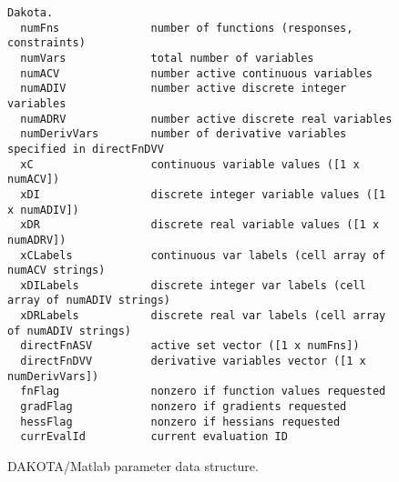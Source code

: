 \begin{figure}
\centering
\begin{bigbox}
\begin{small}
\begin{verbatim}
Dakota.
  numFns              number of functions (responses, constraints)
  numVars             total number of variables
  numACV              number active continuous variables
  numADIV             number active discrete integer variables
  numADRV             number active discrete real variables
  numDerivVars        number of derivative variables specified in directFnDVV
  xC                  continuous variable values ([1 x numACV]) 
  xDI                 discrete integer variable values ([1 x numADIV])
  xDR                 discrete real variable values ([1 x numADRV])
  xCLabels            continuous var labels (cell array of numACV strings)
  xDILabels           discrete integer var labels (cell array of numADIV strings)
  xDRLabels           discrete real var labels (cell array of numADIV strings)
  directFnASV         active set vector ([1 x numFns])
  directFnDVV         derivative variables vector ([1 x numDerivVars])
  fnFlag              nonzero if function values requested
  gradFlag            nonzero if gradients requested
  hessFlag            nonzero if hessians requested
  currEvalId          current evaluation ID
\end{verbatim}
\end{small}
\end{bigbox}
\caption{DAKOTA/Matlab parameter data
structure.\label{advint:figure:matlabparams}}
\end{figure}


